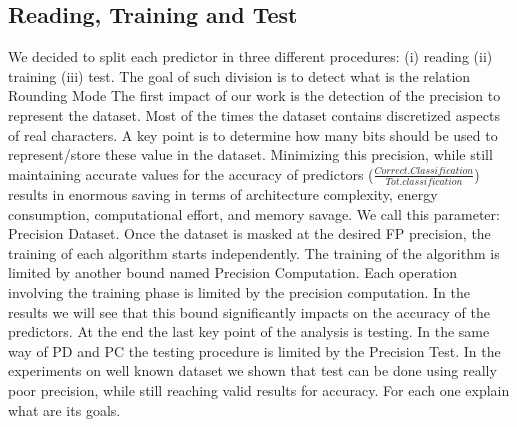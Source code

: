 \documentclass[sigplan,review,anonymous=false]{acmart}\settopmatter{printfolios=true,printccs=false,printacmref=false}
\begin{document}
\subsection{Reading, Training and Test}
We decided to split each predictor in three different procedures: (i) reading (ii) training (iii) test. The goal of such division is to detect what is the relation 
Rounding Mode        
The first impact of our work is the detection of the precision to represent the dataset. 
Most of the times the dataset contains discretized aspects of real characters. A key point is to determine how many bits should be used to represent/store these value in the dataset. Minimizing this precision, while still maintaining accurate values for the accuracy of predictors ($\frac{Correct.Classification}{Tot.classification}$) results in enormous saving in terms of architecture complexity, energy consumption, computational effort, and memory savage\cite{softfloat}. We call this parameter: Precision Dataset.
Once the dataset is masked at the desired FP precision, the training of each algorithm starts independently. The training of the algorithm is limited by another bound named Precision Computation. Each operation involving the training phase is limited by the precision computation. In the results we will see that this bound significantly impacts on the accuracy of the predictors.
At the end the last key point of the analysis is testing. In the same way of PD and PC the testing procedure is limited by the Precision Test. In the experiments on well known dataset we shown that test can be done using really poor precision, while still reaching valid results for accuracy.
For each one explain what are its goals. 

\newpage
\end{document}
